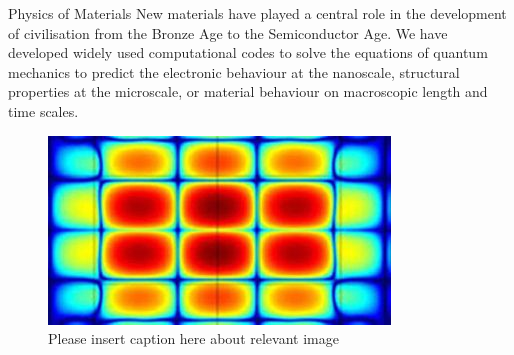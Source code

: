 \documentclass[xcolor={table}]{beamer}
\begin{document}
\begin{frame}[fragile=singleslide,t]
\begin{columns}[onlytextwidth,T]
\begin{column}{.47\textwidth}
\begin{block}{Physics of Materials}
New materials have played a central role in the development of civilisation from
the Bronze Age to the Semiconductor Age. We have developed widely used
computational codes to solve the equations of quantum mechanics to predict the
electronic behaviour at the nanoscale, structural properties at the microscale,
or material behaviour on macroscopic length and time scales.
\end{block}

\begin{figure}
    \includegraphics[width=\columnwidth, height=0.15\textheight]{simulation_materials.jpg}
    \caption{\footnotesize Please insert caption here about relevant image}
\end{figure}

\end{column}
\end{columns}

\end{frame}
\end{document}
